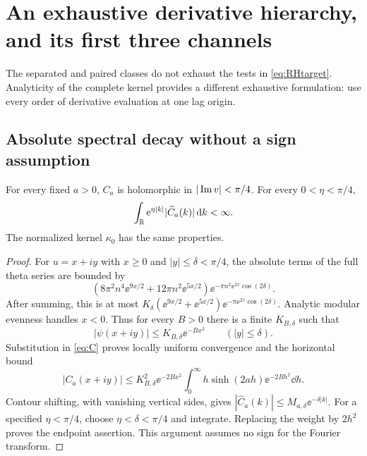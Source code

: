 \section{An exhaustive derivative hierarchy, and its first three channels}
The separated and paired classes do not exhaust the tests in \eqref{eq:RHtarget}. Analyticity of the complete kernel provides a different exhaustive formulation: use every order of derivative evaluation at one lag origin.

\subsection{Absolute spectral decay without a sign assumption}
\begin{lemma}\label{lem:strip}
For every fixed $a>0$, $C_a$ is holomorphic in $|\operatorname{Im} v|<\pi/4$. For every $0<\eta<\pi/4$,
\begin{equation}\label{eq:exponentialMoment}
\int_{\mathbb R}\mathrm e^{\eta|k|}|\widehat C_a(k)|\,\mathrm d k<\infty.
\end{equation}
The normalized kernel $\kappa_0$ has the same properties.
\end{lemma}
\begin{proof}
For $u=x+iy$ with $x\ge0$ and $|y|\le\delta<\pi/4$, the absolute terms of the full theta series are bounded by
\[
\left(8\pi^2n^4\ee^{9x/2}+12\pi n^2\ee^{5x/2}\right)
\ee^{-\pi n^2\ee^{2x}\cos(2\delta)}.
\]
After summing, this is at most
$K_\delta(\ee^{9x/2}+\ee^{5x/2})\ee^{-\pi\ee^{2x}\cos(2\delta)}$.
Analytic modular evenness handles $x<0$. Thus for every $B>0$ there is a finite $K_{B,\delta}$ such that
\[
|\psi(x+iy)|\le K_{B,\delta}\ee^{-Bx^2}\qquad(|y|\le\delta).
\]
Substitution in \eqref{eq:C} proves locally uniform convergence and the horizontal bound
\[
|C_a(x+iy)|\le K_{B,\delta}^2\ee^{-2Bx^2}
\int_0^\infty h\sinh(2ah)\ee^{-2Bh^2}\dd h.
\]
Contour shifting, with vanishing vertical sides, gives
$|\widehat C_a(k)|\le M_{a,\delta}\ee^{-\delta|k|}$.
For a specified $\eta<\pi/4$, choose $\eta<\delta<\pi/4$ and integrate. Replacing the weight by $2h^2$ proves the endpoint assertion. This argument assumes no sign for the Fourier transform.
\end{proof}


